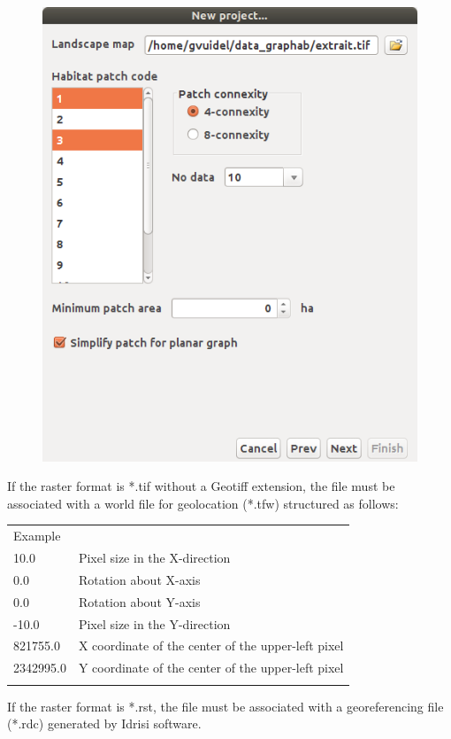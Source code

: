 \documentclass{article}
\begin{document}
\begin{figure}[H]
	\includegraphics[scale=0.5]{img/manual-en_img3.png}
\end{figure}

If the raster format is *.tif without a Geotiff extension, the file must be associated with a world file for geolocation (*.tfw) structured as follows:

\begin{table}[H]

\begin{tabular}{|m{3.552cm}|m{7.0800004cm}}
\hhline{-~}
Example &
\\\hhline{-~}
10.0 & Pixel size in the X-direction\\
0.0 & Rotation about X-axis \\
0.0 & Rotation about Y-axis \\
{}-10.0 & Pixel size in the Y-direction \\
821755.0 & X coordinate of the center of the upper-left pixel\\
2342995.0 & Y coordinate of the center of the upper-left pixel\\\hhline{-~}
\end{tabular}
\end{table}
If the raster format is *.rst, the file must be associated with a georeferencing file (*.rdc) generated by Idrisi software.  
\end{document}
